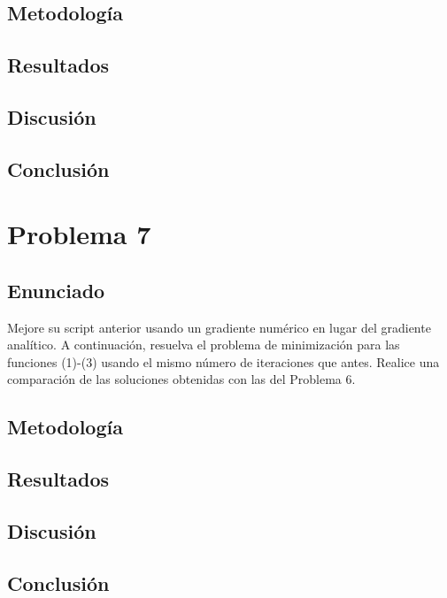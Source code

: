 \documentclass{article}
\begin{document}
\subsection{Metodología}

\subsection{Resultados}
\setcounter{equation}{0}

\subsection{Discusión}

\subsection{Conclusión}

\section{Problema 7}

\subsection{Enunciado}
Mejore su script anterior usando un gradiente numérico en lugar del gradiente analítico. A continuación, resuelva el problema de minimización para las funciones (1)-(3) usando el mismo número de iteraciones que antes. Realice una comparación de las soluciones obtenidas con las del Problema 6.


\subsection{Metodología}

\subsection{Resultados}
\setcounter{equation}{0}

\subsection{Discusión}

\subsection{Conclusión}
\end{document}
